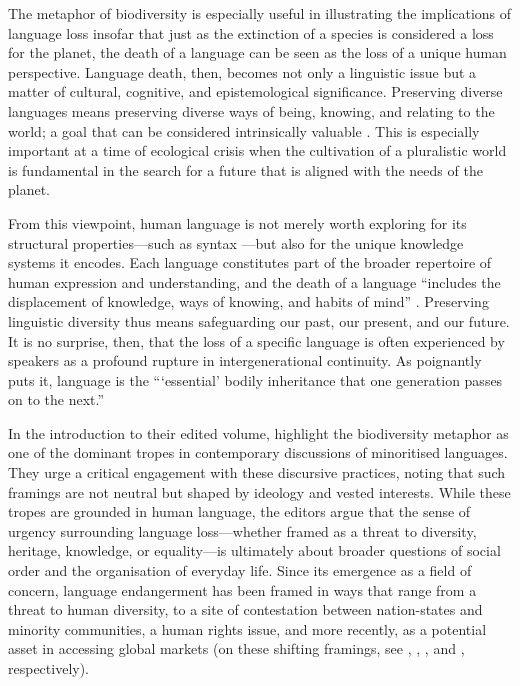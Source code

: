 \documentclass[a4paper,11pt]{article}
\begin{document}
The metaphor of biodiversity is especially useful in illustrating the implications of language loss insofar that just as the extinction of a species is considered a loss for the planet, the death of a language can be seen as the loss of a unique human perspective. Language death, then, becomes not only a linguistic issue but a matter of cultural, cognitive, and epistemological significance. Preserving diverse languages means preserving diverse ways of being, knowing, and relating to the world; a goal that can be considered intrinsically valuable \citep[cf.][]{maffi2002a}. This is especially important at a time of ecological crisis when the cultivation of a pluralistic world is fundamental in the search for a future that is aligned with the needs of the planet.

From this viewpoint, human language is not merely worth exploring for its structural properties—such as syntax —but also for the unique knowledge systems it encodes. Each language constitutes part of the broader repertoire of human expression and understanding, and the death of a language ``includes the displacement of knowledge, ways of knowing, and habits of mind'' \citep[3]{piirainen2015language}. Preserving linguistic diversity thus means safeguarding our past, our present, and our future. It is no surprise, then, that the loss of a specific language is often experienced by speakers as a profound rupture in intergenerational continuity. As \citet[5]{fishman2001a} poignantly puts it, language is the ```essential' bodily inheritance that one generation passes on to the next.''

In the introduction to their edited volume, \citet{heller2008a} highlight the biodiversity metaphor as one of the dominant tropes in contemporary discussions of minoritised languages. They urge a critical engagement with these discursive practices, noting that such framings are not neutral but shaped by ideology and vested interests. While these tropes are grounded in human language, the editors argue that the sense of urgency surrounding language loss—whether framed as a threat to diversity, heritage, knowledge, or equality—is ultimately about broader questions of social order and the organisation of everyday life. Since its emergence as a field of concern, language endangerment has been framed in ways that range from a threat to human diversity, to a site of contestation between nation-states and minority communities, a human rights issue, and more recently, as a potential asset in accessing global markets (on these shifting framings, see \citealt{muehlmann2008a}, \citealt{hobsbawm1990a}, \citealt{skutnabb-kangas2000a}, and \citealt{valle2008a}, respectively).
\end{document}
